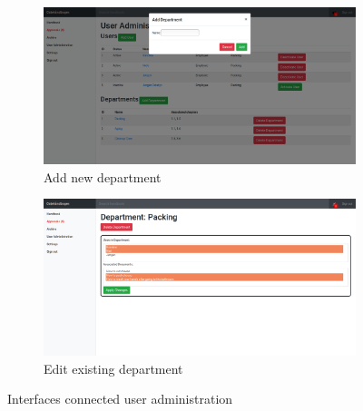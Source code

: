 \begin{figure}[H]\ContinuedFloat
	\centering
	\begin{subfigure}[b]{0.48\textwidth}
		\includegraphics[width=\textwidth]{billeder/iteration1Prototyper/AddDepartment.png}
		\caption{Add new department}
		\label{fig:3-AddDep}
	\end{subfigure}
	\quad
	\begin{subfigure}[b]{0.48\textwidth}
		\includegraphics[width=\textwidth]{billeder/iteration1Prototyper/DepartmentEdit.png}
		\caption{Edit existing department}
		\label{fig:3-EditDep}
	\end{subfigure}
	\caption{Interfaces connected user administration}\label{fig:3-UserAdminPages}
\end{figure}

